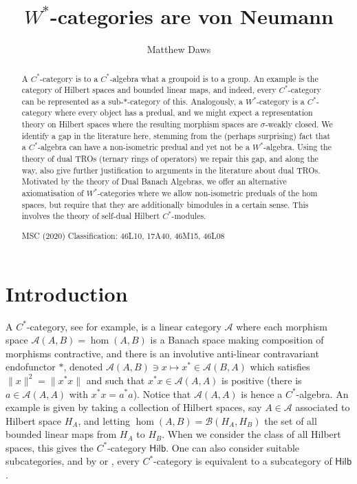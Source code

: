 \documentclass[a4paper,11pt]{article}
\theoremstyle{plain}
\theoremstyle{remark}
\newcommand{\mc}[1]{\mathcal{#1}}
\newcommand{\catHilb}{\textsf{Hilb}}
\begin{document}
\title{$W^*$-categories are von Neumann}
\author{Matthew Daws}
\maketitle

\begin{abstract}
A $C^*$-category is to a $C^*$-algebra what a groupoid is to a group.  An example is the category of Hilbert spaces and bounded linear maps, and indeed, every $C^*$-category can be represented as a sub-$*$-category of this.  Analogously, a $W^*$-category is a $C^*$-category where every object has a predual, and we might expect a representation theory on Hilbert spaces where the resulting morphism spaces are $\sigma$-weakly closed.  We identify a gap in the literature here, stemming from the (perhaps surprising) fact that a $C^*$-algebra can have a non-isometric predual and yet not be a $W^*$-algebra.  Using the theory of dual TROs (ternary rings of operators) we repair this gap, and along the way, also give further justification to arguments in the literature about dual TROs.  Motivated by the theory of Dual Banach Algebras, we offer an alternative axiomatisation of $W^*$-categories where we allow non-isometric preduals of the hom spaces, but require that they are additionally bimodules in a certain sense.  This involves the theory of self-dual Hilbert $C^*$-modules.

MSC (2020) Classification: 46L10, 17A40, 46M15, 46L08
\end{abstract}

\section{Introduction}

A $C^*$-category, see \cite{GLR_Wstar_categories,mitchener_cstar_cats} for example, is a linear category $\mc A$ where each morphism space $\mc A(A,B) = \hom(A,B)$ is a Banach space making composition of morphisms contractive, and there is an involutive anti-linear contravariant endofunctor $*$, denoted $\mc A(A,B) \ni x \mapsto x^*\in\mc A(B,A)$ which satisfies $\|x\|^2 = \|x^*x\|$ and such that $x^*x \in \mc A(A,A)$ is positive (there is $a\in\mc A(A,A)$ with $x^*x = a^*a$).  Notice that $\mc A(A,A)$ is hence a $C^*$-algebra.  An example is given by taking a collection of Hilbert spaces, say $A\in\mc A$ associated to Hilbert space $H_A$, and letting $\hom(A,B) = \mc B(H_A,H_B)$ the set of all bounded linear maps from $H_A$ to $H_B$.  When we consider the class of all Hilbert spaces, this gives the $C^*$-category $\catHilb$.  One can also consider suitable subcategories, and by \cite[Proposition~1.14]{GLR_Wstar_categories} or \cite[Section~6]{mitchener_cstar_cats}, every $C^*$-category is equivalent to a subcategory of $\catHilb$.
\end{document}
